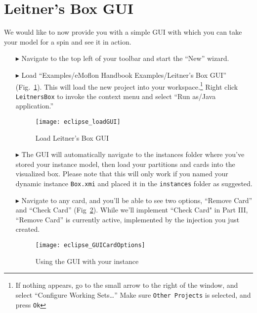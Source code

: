 \newpage
\section{Leitner's Box GUI}
\genHeader

We would like to now provide you with a simple GUI with which you can take your model for a spin and see it in action.

\begin{itemize}

\item[$\blacktriangleright$] Navigate to the top left of your toolbar and start the ``New'' wizard.

\item[$\blacktriangleright$] Load ``Examples/eMoflon Handbook Examples/Leitner's Box GUI'' (Fig.~\ref{fig:GUI_load}). This will load the new project into
your workspace.\footnote{If nothing appears, go to the small arrow to the right of the window, and select ``Configure Working Sets\ldots'' Make sure
\texttt{Other Projects} is selected, and press \texttt{Ok}} Right click \texttt{LeitnersBox} to invoke the context menu and select ``Run as/Java application.''

\begin{figure}[htbp]
    \centering
    \texttt{[image: eclipse\_loadGUI]}
    \caption{Load Leitner's Box GUI}
    \label{fig:GUI_load}
\end{figure}

\clearpage

\item[$\blacktriangleright$] The GUI will automatically navigate to the instances folder where you've stored your instance model, then load your partitions and
cards into the visualized box. Please note that this will only work if you named your dynamic instance \texttt{Box.xmi} and placed it in the \texttt{instances}
folder as suggested.

\vspace{1cm}

\item[$\blacktriangleright$] Navigate to any card, and you'll be able to see two options, ``Remove Card'' and ``Check Card'' (Fig~\ref{fig:GUI_cardOptions}).
While we'll implement ``Check Card" in Part III, ``Remove Card'' is currently active, implemented by the injection you just created.

\vspace{1cm}

\begin{figure}[htbp]
    \centering
    \texttt{[image: eclipse\_GUICardOptions]}
    \caption{Using the GUI with your instance}
    \label{fig:GUI_cardOptions}
\end{figure}


\end{itemize}
